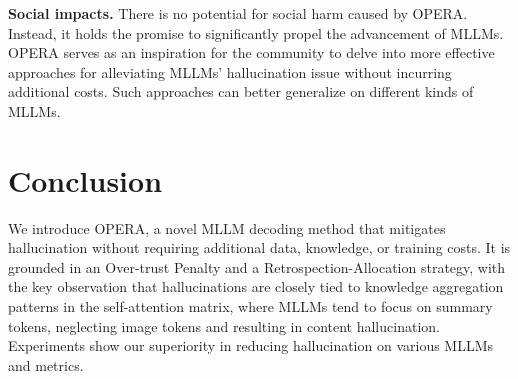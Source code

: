 \noindent\textbf{Social impacts.} 
There is no potential for social harm caused by OPERA. 
Instead, it holds the promise to significantly propel the advancement of MLLMs.
OPERA serves as an inspiration for the community to delve into more effective approaches for alleviating MLLMs' hallucination issue without incurring additional costs. 
Such approaches can better generalize on different kinds of MLLMs.




\section{Conclusion}

We introduce OPERA, a novel MLLM decoding method that mitigates hallucination without requiring additional data, knowledge, or training costs. 
It is grounded in an Over-trust Penalty and a Retrospection-Allocation strategy, with the key observation that hallucinations are closely tied to knowledge aggregation patterns in the self-attention matrix, where MLLMs tend to focus on summary tokens, neglecting image tokens and resulting in content hallucination. 
Experiments show our superiority in reducing hallucination on various MLLMs and metrics.
